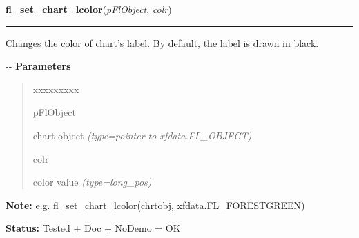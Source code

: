 \hspace{.8\funcindent}\begin{boxedminipage}{\funcwidth}

    \raggedright \textbf{fl\_set\_chart\_lcolor}(\textit{pFlObject}, \textit{colr})

    \vspace{-1.5ex}

    \rule{\textwidth}{0.5\fboxrule}
\setlength{\parskip}{2ex}

Changes the color of chart's label. By default, the label is
drawn in black.

-{}-
\setlength{\parskip}{1ex}
      \textbf{Parameters}
      \vspace{-1ex}

      \begin{quote}
        \begin{Ventry}{xxxxxxxxx}

          \item[pFlObject]


chart object
            {\it (type=pointer to xfdata.FL\_OBJECT)}

          \item[colr]


color value
            {\it (type=long\_pos)}

        \end{Ventry}

      \end{quote}

\textbf{Note:} 
e.g. fl\_set\_chart\_lcolor(chrtobj, xfdata.FL\_FORESTGREEN)


\textbf{Status:} 
Tested + Doc + NoDemo = OK


    \end{boxedminipage}

    \label{xformslib:flchart:fl_set_chart_lcolor}

    \vspace{0.5ex}


